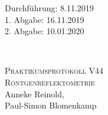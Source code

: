 



\begin{titlepage}
  \begin{flushleft}
 Durchführung: 8.11.2019\\
 1. Abgabe: 16.11.2019\\
 2. Abgabe: 10.01.2020
  \end{flushleft}


\HRule\\[1,0cm]

 \begin{center}


\textsc{\LARGE Praktikumsprotokoll V44}\\[1.5cm]
\textsc{\huge Röntgenreflektometrie} \\[5,5cm]

Anneke Reinold\footnotemark[1], \\
Paul-Simon Blomenkamp\footnotemark[2] \\[1,0cm]



 \end{center}
\HRule

 \vfill
\end{titlepage}






\printbibliography


